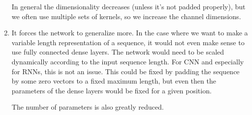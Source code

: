 \begin{solution}
\begin{enumerate}
   In general the dimensionality decreases (unless it's not padded properly), but we often use multiple sets of kernels, so we increase the channel dimensions.
   
   \item It forces the network to generalize more. In the case where we want to make a variable length representation of a sequence, it would not even make sense to use fully connected dense layers. The network would need to be scaled dynamically according to the input sequence length. For CNN and especially for RNNs, this is not an issue. This could be fixed by padding the sequence by some zero vectors to a fixed maximum length, but even then the parameters of the dense layers would be fixed for a given position.
   
   The number of parameters is also greatly reduced.
\end{enumerate}
\end{solution}


